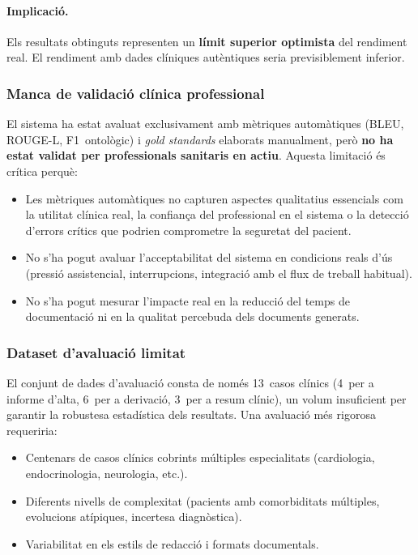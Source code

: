 \documentclass[CAT]{TFUOC}%
\begin{document}
\paragraph{Implicació.}
Els resultats obtinguts representen un \textbf{límit superior optimista} del rendiment real. El rendiment amb dades clíniques autèntiques seria previsiblement inferior.

\subsubsection{Manca de validació clínica professional}

El sistema ha estat avaluat exclusivament amb mètriques automàtiques (BLEU, ROUGE-L, F1~ontològic) i \textit{gold standards} elaborats manualment, però \textbf{no ha estat validat per professionals sanitaris en actiu}. Aquesta limitació és crítica perquè:

\begin{itemize}
    \item Les mètriques automàtiques no capturen aspectes qualitatius essencials com la utilitat clínica real, la confiança del professional en el sistema o la detecció d'errors crítics que podrien comprometre la seguretat del pacient.
    
    \item No s'ha pogut avaluar l'acceptabilitat del sistema en condicions reals d'ús (pressió assistencial, interrupcions, integració amb el flux de treball habitual).
    
    \item No s'ha pogut mesurar l'impacte real en la reducció del temps de documentació ni en la qualitat percebuda dels documents generats.
\end{itemize}

\subsubsection{Dataset d'avaluació limitat}

El conjunt de dades d'avaluació consta de només 13~casos clínics (4~per a informe d'alta, 6~per a derivació, 3~per a resum clínic), un volum insuficient per garantir la robustesa estadística dels resultats. Una avaluació més rigorosa requeriria:

\begin{itemize}
    \item Centenars de casos clínics cobrints múltiples especialitats (cardiologia, endocrinologia, neurologia, etc.).
    \item Diferents nivells de complexitat (pacients amb comorbiditats múltiples, evolucions atípiques, incertesa diagnòstica).
    \item Variabilitat en els estils de redacció i formats documentals.
\end{itemize}
\end{document}
